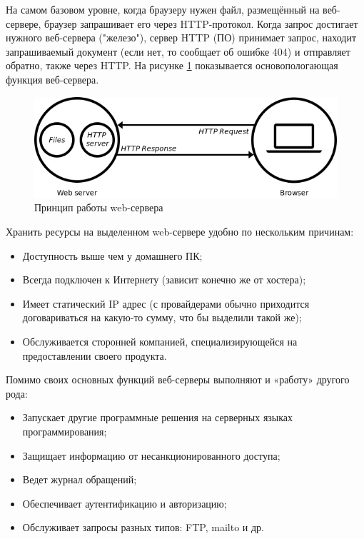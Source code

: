 На самом базовом уровне, когда браузеру нужен файл, размещённый на веб-сервере,
браузер запрашивает его через HTTP-протокол. Когда запрос достигает нужного
веб-сервера ("железо"), сервер HTTP (ПО) принимает запрос, находит запрашиваемый
документ (если нет, то сообщает об ошибке 404) и отправляет обратно, также через
HTTP. На рисунке \ref{fig:web-serv} показывается основопологающая функция
веб-сервера.
\begin{figure}[H]
    \centering
    \includegraphics[scale=0.60]{inc/img/web-server.png}
    \caption{Принцип работы web-сервера}
    \label{fig:web-serv}
\end{figure}

Хранить ресурсы на выделенном web-сервере удобно по нескольким причинам:
\begin{itemize}
    \item Доступность выше чем у домашнего ПК;
    \item Всегда подключен к Интернету (зависит конечно же от хостера);
    \item Имеет статический IP адрес (с провайдерами обычно приходится договариваться на какую-то сумму, что бы выделили такой же);
    \item Обслуживается сторонней компанией, специализирующейся на предоставлении своего продукта.
\end{itemize}

Помимо своих основных функций веб-серверы выполняют и «работу» другого рода:
\begin{itemize}
    \item Запускает другие программные решения на серверных языках программирования;
    \item Защищает информацию от несанкционированного доступа;
    \item Ведет журнал обращений;
    \item Обеспечивает аутентификацию и авторизацию;
    \item Обслуживает запросы разных типов: FTP, mailto и др.
\end{itemize}

